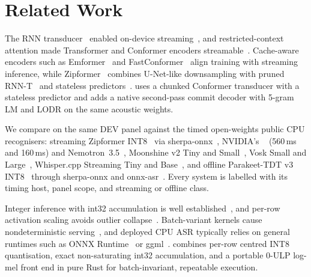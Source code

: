 \section{Related Work}\label{sec:related}

 The RNN transducer~\cite{graves2012rnnt} enabled on-device
streaming~\cite{he2019streaming}, and restricted-context attention made Transformer and Conformer
encoders streamable~\cite{gulati2020conformer,zhang2020transformertransducer,chen2021developing,yao2021wenet}.
Cache-aware encoders such as Emformer~\cite{shi2021emformer} and
FastConformer~\cite{rekesh2023fastconformer,noroozi2024stateful} align training with streaming
inference, while Zipformer~\cite{yao2024zipformer} combines U-Net-like downsampling with pruned
RNN-T~\cite{kuang2022pruned} and stateless predictors~\cite{ghodsi2020stateless}. \ultra{} uses a
chunked Conformer transducer with a stateless predictor and adds a native second-pass commit decoder
with 5-gram LM and LODR on the same acoustic weights.

 We compare on the same DEV panel against the \ColdComparatorCount{}
timed open-weights public CPU recognisers: streaming Zipformer INT8~\cite{yao2024zipformer,icefall}
via sherpa-onnx~\cite{sherpaonnx}, NVIDIA's \NemotronEN~\cite{nemotron} (560\,ms and 160\,ms) and
Nemotron~3.5~\cite{nvidia2026nemotron35}, Moonshine v2 Tiny and Small~\cite{kudlur2026moonshinev2},
Vosk Small and Large~\cite{vosk}, Whisper.cpp Streaming Tiny and
Base~\cite{radford2023whisper,whispercpp}, and offline Parakeet-TDT v3
INT8~\cite{xu2023tdt,nvidia2025parakeettdtv3} through sherpa-onnx and onnx-asr~\cite{onnxasr}. Every
system is labelled with its timing host, panel scope, and streaming or offline class.

 Integer inference with int32 accumulation is well
established~\cite{jacob2018quantization,kim2021ibert,wu2020integer,nagel2021whitepaper}, and per-row
activation scaling avoids outlier collapse~\cite{dettmers2022llmint8}. Batch-variant kernels cause
nondeterministic serving~\cite{he2025nondeterminism}, and deployed CPU ASR typically relies on general
runtimes such as ONNX Runtime~\cite{onnxruntime} or ggml~\cite{nemospeechcpp}. \ultra{} combines per-row
centred INT8 quantisation, exact non-saturating int32 accumulation, and a portable 0-ULP log-mel front
end in pure Rust for batch-invariant, repeatable execution.

